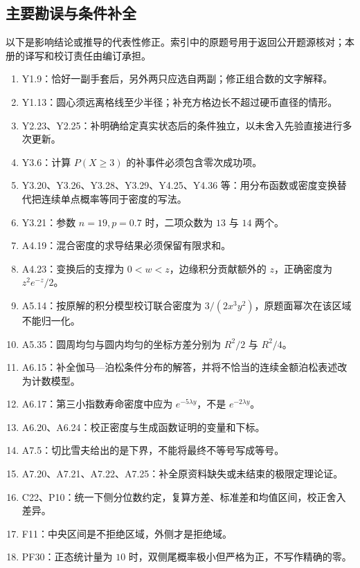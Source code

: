 \documentclass[UTF8,12pt,a4paper,fontset=fandol]{ctexbook}
\begin{document}
\subsection*{主要勘误与条件补全}
以下是影响结论或推导的代表性修正。索引中的原题号用于返回公开题源核对；本册的译写和校订责任由编订承担。
\begin{enumerate}
\item Y1.9：恰好一副手套后，另外两只应选自两副；修正组合数的文字解释。
\item Y1.13：圆心须远离格线至少半径；补充方格边长不超过硬币直径的情形。
\item Y2.23、Y2.25：补明确给定真实状态后的条件独立，以未舍入先验直接进行多次更新。
\item Y3.6：计算 $P(X\ge3)$ 的补事件必须包含零次成功项。
\item Y3.20、Y3.26、Y3.28、Y3.29、Y4.25、Y4.36 等：用分布函数或密度变换替代把连续单点概率等同于密度的写法。
\item Y3.21：参数 $n=19,p=0.7$ 时，二项众数为 $13$ 与 $14$ 两个。
\item A4.19：混合密度的求导结果必须保留有限求和。
\item A4.23：变换后的支撑为 $0<w<z$，边缘积分贡献额外的 $z$，正确密度为 $z^2e^{-z}/2$。
\item A5.14：按原解的积分模型校订联合密度为 $3/(2x^3y^2)$，原题面幂次在该区域不能归一化。
\item A5.35：圆周均匀与圆内均匀的坐标方差分别为 $R^2/2$ 与 $R^2/4$。
\item A6.15：补全伽马—泊松条件分布的解答，并将不恰当的连续金额泊松表述改为计数模型。
\item A6.17：第三小指数寿命密度中应为 $e^{-5\lambda y}$，不是 $e^{-2\lambda y}$。
\item A6.20、A6.24：校正密度与生成函数证明的变量和下标。
\item A7.5：切比雪夫给出的是下界，不能将最终不等号写成等号。
\item A7.20、A7.21、A7.22、A7.25：补全原资料缺失或未结束的极限定理论证。
\item C22、P10：统一下侧分位数约定，复算方差、标准差和均值区间，校正舍入差异。
\item F11：中央区间是不拒绝区域，外侧才是拒绝域。
\item PF30：正态统计量为 $10$ 时，双侧尾概率极小但严格为正，不写作精确的零。
\end{enumerate}

\clearpage
\end{document}
